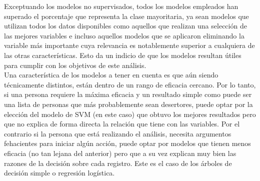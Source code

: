 Exceptuando los modelos no supervisados, todos los modelos empleados han superado el porcentaje que representa la clase mayoritaria, ya sean modelos que utilizan todos los datos disponibles como aquellos que realizan una selección de las mejores variables e incluso aquellos modelos que se aplicaron eliminando la variable más importante cuya relevancia es notablemente superior a cualquiera de las otras características. Esto da un indicio de que los modelos resultan útiles para cumplir con los objetivos de este análisis.\\

Una característica de los modelos a tener en cuenta es que aún siendo  técnicamente distintos, están dentro de un rango de eficacia cercano. Por lo tanto, si una persona requiere la máxima eficacia y un resultado simple como puede ser una lista de personas que más probablemente sean desertores, puede optar por la elección del modelo de SVM (en este caso) que obtuvo los mejores resultados pero que no explica de forma directa la relación que tiene con las variables. Por el contrario si la persona que está realizando el análisis, necesita argumentos fehacientes para iniciar algún acción, puede optar por modelos que tienen menos eficacia (no tan lejana del anterior) pero que a su vez explican muy bien las razones de la decisión sobre cada registro. Este es el caso de los árboles de decisión simple o regresión logística.

